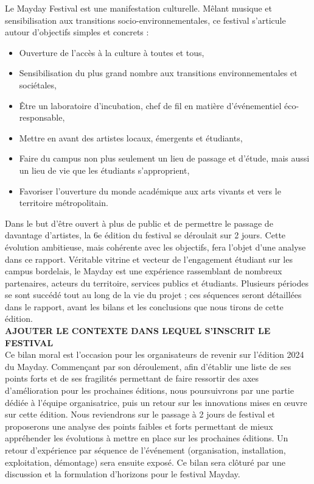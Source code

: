 \documentclass[12pt,a4paper]{report}
\begin{document}
Le Mayday Festival est une manifestation culturelle. Mêlant musique et sensibilisation aux transitions socio-environnementales, ce festival s'articule autour d'objectifs simples et concrets :
\begin{itemize}
\item Ouverture de l’accès à la culture à toutes et tous,
\item Sensibilisation du plus grand nombre aux transitions environnementales et sociétales,
\item Être un laboratoire d’incubation, chef de fil en matière d’événementiel éco-responsable,
\item Mettre en avant des artistes locaux, émergents et étudiants,
\item Faire du campus non plus seulement un lieu de passage et d'étude, mais aussi un lieu de vie que les étudiants s'approprient,
\item Favoriser l’ouverture du monde académique aux arts vivants et vers le territoire métropolitain.
\end{itemize}
Dans le but d’être ouvert à plus de public et de permettre le passage de davantage d’artistes, la 6e édition du festival se déroulait sur 2 jours. Cette évolution ambitieuse, mais cohérente avec les objectifs, fera l’objet d’une analyse dans ce rapport. Véritable vitrine et vecteur de l'engagement étudiant sur les campus bordelais, le Mayday est une expérience rassemblant de nombreux partenaires, acteurs du territoire, services publics et étudiants. Plusieurs périodes se sont succédé tout au long de la vie du projet ; ces séquences seront détaillées dans le rapport, avant les bilans et les conclusions que nous tirons de cette édition.\\

\textbf{AJOUTER LE CONTEXTE DANS LEQUEL S'INSCRIT LE FESTIVAL}\\

Ce bilan moral est l’occasion pour les organisateurs de revenir sur l’édition 2024 du Mayday. Commençant par son déroulement, afin d’établir une liste de ses points forts et de ses fragilités permettant de faire ressortir des axes d’amélioration pour les prochaines éditions, nous poursuivrons par une partie dédiée à l'équipe organisatrice, puis un retour sur les innovations mises en œuvre sur cette édition. Nous reviendrons sur le passage à 2 jours de festival et proposerons une analyse des points faibles et forts permettant de mieux appréhender les évolutions à mettre en place sur les prochaines éditions. Un retour d'expérience par séquence de l'événement (organisation, installation, exploitation, démontage) sera ensuite exposé. Ce bilan sera clôturé par une discussion et la formulation d'horizons pour le festival Mayday.
\end{document}
